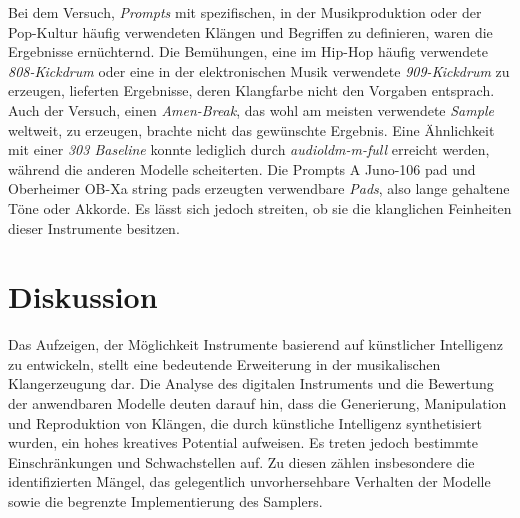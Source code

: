 \documentclass[
  a4paper,  %
  twoside,  %
  bibliography=totoc,
  headsepline,
  cleardoublepage=empty,
  parskip=half,
  draft=false
]{scrbook}
\begin{document}
Bei dem Versuch, \emph{Prompts} mit spezifischen, in der Musikproduktion oder der Pop-Kultur häufig verwendeten Klängen und Begriffen zu definieren, waren die Ergebnisse ernüchternd. Die Bemühungen, eine im Hip-Hop häufig verwendete \emph{808-Kickdrum} oder eine in der elektronischen Musik verwendete \emph{909-Kickdrum} zu erzeugen, lieferten Ergebnisse, deren Klangfarbe nicht den Vorgaben entsprach. Auch der Versuch, einen \emph{Amen-Break}, das wohl am meisten verwendete \emph{Sample} weltweit, zu erzeugen, brachte nicht das gewünschte Ergebnis. Eine Ähnlichkeit mit einer \emph{303 Baseline} konnte lediglich durch \emph{audioldm-m-full} erreicht werden, während die anderen Modelle scheiterten. Die Prompts \glqq A Juno-106 pad\grqq{} und \glqq Oberheimer OB-Xa string pads\grqq{} erzeugten verwendbare \emph{Pads}, also lange gehaltene Töne oder Akkorde. Es lässt sich jedoch streiten, ob sie die klanglichen Feinheiten dieser Instrumente besitzen. 

\chapter{Diskussion}
Das Aufzeigen, der Möglichkeit Instrumente basierend auf künstlicher Intelligenz zu entwickeln, stellt eine bedeutende Erweiterung in der musikalischen Klangerzeugung dar. Die Analyse des digitalen Instruments und die Bewertung der anwendbaren Modelle deuten darauf hin, dass die Generierung, Manipulation und Reproduktion von Klängen, die durch künstliche Intelligenz synthetisiert wurden, ein hohes kreatives Potential aufweisen. Es treten jedoch bestimmte Einschränkungen und Schwachstellen auf. Zu diesen zählen insbesondere die identifizierten Mängel, das gelegentlich unvorhersehbare Verhalten der Modelle sowie die begrenzte Implementierung des Samplers.
\end{document}
